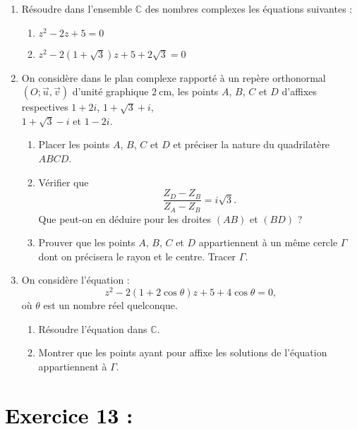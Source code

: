 \documentclass[12pt]{article}
\begin{document}
\begin{enumerate}
    \item Résoudre dans l’ensemble $\mathbb{C}$ des nombres complexes les équations suivantes :
    \begin{enumerate}
        \item $z^2 - 2z + 5 = 0$
        \item $z^2 - 2(1 + \sqrt{3})z + 5 + 2\sqrt{3} = 0$
    \end{enumerate}

    \item On considère dans le plan complexe rapporté à un repère orthonormal $(O; \vec{u}, \vec{v})$ d’unité graphique $2\ \text{cm}$, les points $A$, $B$, $C$ et $D$ d’affixes respectives $1 + 2i$, $1 + \sqrt{3} + i$,\\ $1 + \sqrt{3} - i$ et $1 - 2i$.
    \begin{enumerate}
        
        \item Placer les points $A$, $B$, $C$ et $D$ et préciser la nature du quadrilatère $ABCD$.

        \item Vérifier que 
        \[
        \frac{Z_D - Z_B}{Z_A - Z_B} = i\sqrt{3}.
        \]
        Que peut-on en déduire pour les droites $(AB)$ et $(BD)$ ?

        \item Prouver que les points $A$, $B$, $C$ et $D$ appartiennent à un même cercle $\Gamma$ dont on précisera le rayon et le centre. Tracer $\Gamma$.
    \end{enumerate}

    \item On considère l’équation :
    \[
    z^2 - 2(1 + 2\cos\theta)z + 5 + 4\cos\theta = 0,
    \]
    où $\theta$ est un nombre réel quelconque.
    \begin{enumerate}
        \item Résoudre l’équation dans $\mathbb{C}$.

        \item Montrer que les points ayant pour affixe les solutions de l’équation appartiennent à $\Gamma$.
    \end{enumerate}
\end{enumerate}

\section*{\textcolor{black}{Exercice 13 :}}
\end{document}
